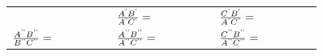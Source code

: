 {{\begin{center}
\begin{xtabular}[t]{|l|l|l|}
               &
                \begin{math}\frac{{A}^{\text{'}}{B}^{\text{'}}}{{A}^{\text{'}}{C}^{\text{'}}}=\phantom{\rule{42.67912pt}{0ex}}\end{math}
               &
                \begin{math}\frac{{C}^{\text{'}}{B}^{\text{'}}}{{A}^{\text{'}}{C}^{\text{'}}}=\phantom{\rule{42.67912pt}{0ex}}\end{math}
     \tabularnewline{}
                \begin{math}\frac{{A}^{\text{'}\text{'}}{B}^{\text{'}\text{'}}}{{B}^{\text{'}\text{'}}{C}^{\text{'}\text{'}}}=\phantom{\rule{42.67912pt}{0ex}}\end{math}
               &
                \begin{math}\frac{{A}^{\text{'}\text{'}}{B}^{\text{'}\text{'}}}{{A}^{\text{'}\text{'}}{C}^{\text{'}\text{'}}}=\phantom{\rule{42.67912pt}{0ex}}\end{math}
               &
                \begin{math}\frac{{C}^{\text{'}\text{'}}{B}^{\text{'}\text{'}}}{{A}^{\text{'}\text{'}}{C}^{\text{'}\text{'}}}=\phantom{\rule{42.67912pt}{0ex}}\end{math}
     \tabularnewline{}
    \end{xtabular}
      \end{center}
}}
